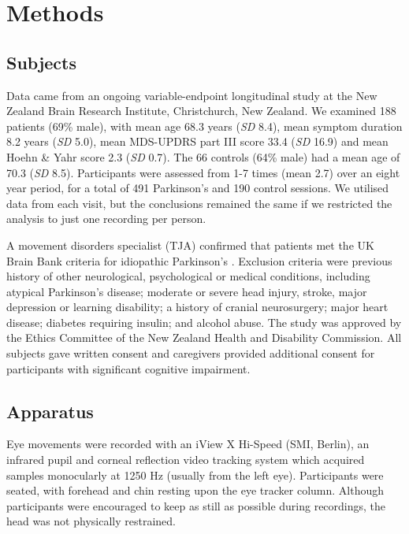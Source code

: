 \documentclass[jou,a4paper]{apa6}
\begin{document}
\begin{figure}[htbp]
\begin{center}
\label{fig:PCCR}
\end{center}
\end{figure}

\section{Methods}

\subsection{Subjects}

Data came from an ongoing variable-endpoint longitudinal study at the New Zealand Brain Research Institute, Christchurch, New Zealand. We examined 188 patients (69\% male), with mean age 68.3 years (\textit{SD} 8.4), mean symptom duration 8.2 years (\textit{SD} 5.0), mean MDS-UPDRS part III score 33.4 (\textit{SD} 16.9) and mean Hoehn \& Yahr score 2.3 (\textit{SD} 0.7). The 66 controls (64\% male) had a mean age of 70.3 (\textit{SD} 8.5). Participants were assessed from 1-7 times (mean 2.7) over an eight year period, for a total of 491 Parkinson's and 190 control sessions. We utilised data from each visit, but the conclusions remained the same if we restricted the analysis to just one recording per person. 

A movement disorders specialist (TJA) confirmed that patients met the UK Brain Bank criteria for idiopathic Parkinson's \citep{Hughes1992Accuracy-of-cli}. Exclusion criteria were previous history of other neurological, psychological or medical conditions, including atypical Parkinson's disease; moderate or severe head injury, stroke, major depression or learning disability; a history of cranial neurosurgery; major heart disease; diabetes requiring insulin; and alcohol abuse. The study was approved by the Ethics Committee of the New Zealand Health and Disability Commission. All subjects gave written consent and caregivers provided additional consent for participants with significant cognitive impairment.

\subsection{Apparatus}
Eye movements were recorded with an iView X Hi-Speed (SMI, Berlin), an infrared pupil and corneal reflection video tracking system which acquired samples monocularly at 1250 Hz (usually from the left eye). Participants were seated, with forehead and chin resting upon the eye tracker column. Although participants were encouraged to keep as still as possible during recordings, the head was not physically restrained.
\end{document}
